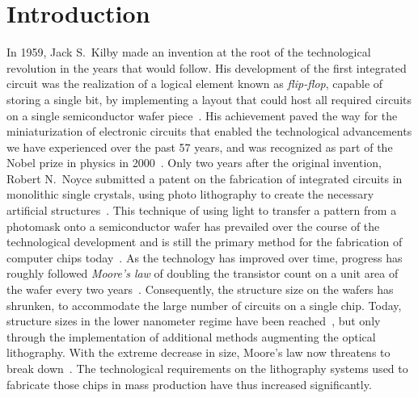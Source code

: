 \glsresetall
\chapter{Introduction} \label{ch:Intro}
In 1959, Jack S.~Kilby made an invention at the root of the technological
revolution in the years that would follow.
His development of the first integrated circuit was the realization of a logical
element known as \emph{flip-flop}, capable of storing a single bit, by
implementing a layout that could host all required circuits on a single
semiconductor wafer piece~\cite{kilby_invention_1976}.
His achievement paved the way for the miniaturization of electronic circuits
that enabled the technological advancements we have experienced over the past 57
years, and was recognized as part of the Nobel prize in physics in
2000~\cite{noauthor_2000_nodate}.
Only two years after the original invention, Robert N.~Noyce submitted a patent
on the fabrication of integrated circuits in monolithic single crystals, using
photo lithography to create the necessary artificial
structures~\cite{noyce_semiconductor_1961}.
This technique of using light to transfer a pattern from a photomask onto a
semiconductor wafer has prevailed over the course of the technological
development and is still the primary method for the fabrication of computer
chips today~\cite{mack_fundamental_2008}.
As the technology has improved over time, progress has roughly followed
\emph{Moore's law} of doubling the transistor count on a unit area of the wafer
every two years~\cite{moore_cramming_1998}.
Consequently, the structure size on the wafers has shrunken, to accommodate the
large number of circuits on a single chip.
Today, structure sizes in the lower nanometer regime have been
reached~\cite{international_roadmap_committee_international_2015}, but only
through the implementation of additional methods augmenting the optical
lithography.
With the extreme decrease in size, Moore's law now threatens to break
down~\cite{mack_fifty_2011, schaller_moores_1997}.
The technological requirements on the lithography systems used to fabricate
those chips in mass production have thus increased significantly.

